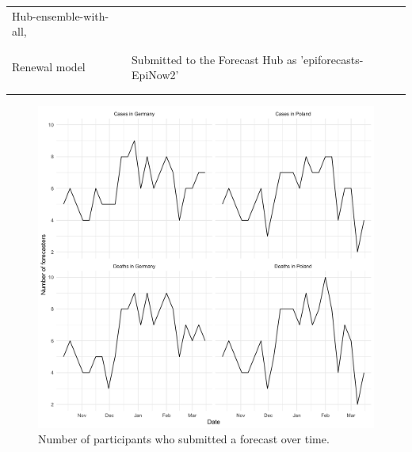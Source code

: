 \documentclass[10pt,letterpaper]{article}
\begin{document}
\begin{longtable}[t]{>{\raggedright\arraybackslash}p{4.5cm}>{\raggedright\arraybackslash}p{7.3cm}}
\addlinespace \addlinespace
Hub-ensemble-with-all, 
\cellcolor{gray!6}{    Hub-ensemble-with-all-mean} & \cellcolor{gray!6}{Versions of the official Hub ensembles which includes all our contributions. For cases, this is identical to the official Hub ensembles, but for deaths the convolution model was added.}\\
\addlinespace \addlinespace
 & \\
\addlinespace \addlinespace
\cellcolor{gray!6}{Crowd forecast} & \cellcolor{gray!6}{Submitted to the Forecast Hub as 'epiforecasts-EpiExpert'}\\
\addlinespace \addlinespace
Renewal model & Submitted to the Forecast Hub as 'epiforecasts-EpiNow2'\\
\addlinespace \addlinespace
\cellcolor{gray!6}{Convolution model} & \cellcolor{gray!6}{Submitted to the Forecast Hub as 'epiforecasts-EpiNow2\_secondary'}\\*
\end{longtable}

\begin{figure}[H]
\includegraphics[width=1\linewidth,]{../analysis/plots/number-forecasters} \caption{Number of participants who submitted a forecast over time.}\label{fig:num-forecasters}
\end{figure}
\end{document}
